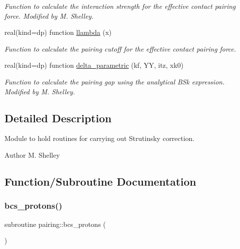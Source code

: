 \begin{DoxyCompactItemize}
\begin{DoxyCompactList}\small\item\em Function to calculate the interaction strength for the effective contact pairing force. Modified by M. Shelley. \end{DoxyCompactList}\item 
real(kind=dp) function \mbox{\hyperlink{namespacepairing_ab022f3dcf7994e9f95315b3b2007a9ee}{llambda}} (x)
\begin{DoxyCompactList}\small\item\em Function to calculate the pairing cutoff for the effective contact pairing force. \end{DoxyCompactList}\item 
real(kind=dp) function \mbox{\hyperlink{namespacepairing_aaa0b619b1e454229caef01a56d0a61fd}{delta\+\_\+parametric}} (kf, YY, itz, xk0)
\begin{DoxyCompactList}\small\item\em Function to calculate the pairing gap using the analytical B\+Sk expression. Modified by M. Shelley. \end{DoxyCompactList}\end{DoxyCompactItemize}


\subsection{Detailed Description}
Module to hold routines for carrying out Strutinsky correction. 

\begin{DoxyAuthor}{Author}
M. Shelley 
\end{DoxyAuthor}


\subsection{Function/\+Subroutine Documentation}
\mbox{\label{namespacepairing_a693cac2cfa7fcb7ad19984fefe20495c}} 
\subsubsection{\texorpdfstring{bcs\+\_\+protons()}{bcs\_protons()}}
{\footnotesize\ttfamily subroutine pairing\+::bcs\+\_\+protons (\begin{DoxyParamCaption}{ }\end{DoxyParamCaption})}



